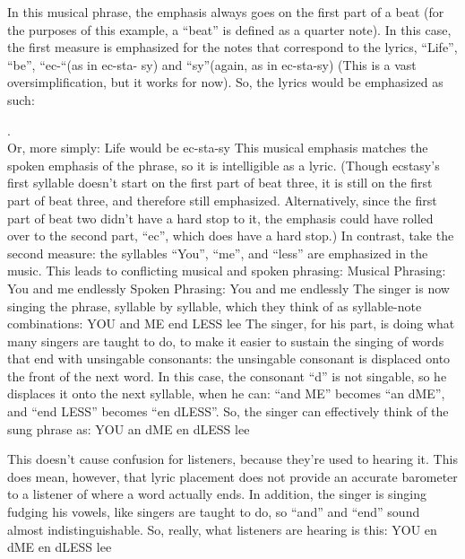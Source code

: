 \documentclass[10pt,oneside]{memoir}
\begin{document}
In this musical phrase, the emphasis always goes on the first part of a beat (for the purposes of this example, a ``beat'' is defined as a quarter note).
In this case, the first measure is emphasized for the notes that correspond to the lyrics, ``Life'', ``be'', ``ec-``(as in ec-sta- sy) and ``sy''(again, as in ec-sta-sy) (This is a vast oversimplification, but it works for now). So, the lyrics would be emphasized as such:
\begin{figure}
\begin{center}
\end{center}
\label{page2image44544.png}
\end{figure}

    . \\
Or, more simply:
Life would be ec-sta-sy
This musical emphasis matches the spoken emphasis of the phrase, so it is intelligible as a lyric. (Though ecstasy's first syllable doesn't start on the first part of beat three, it is still on the first part of beat three, and therefore still emphasized. Alternatively, since the first part of beat two didn't have a hard stop to it, the emphasis could have rolled over to the second part, ``ec'', which does have a hard stop.)
In contrast, take the second measure: the syllables ``You'', ``me'', and ``less'' are emphasized in the music. This leads to conflicting musical and spoken phrasing:
Musical Phrasing: You and me endlessly 
Spoken Phrasing: You and me endlessly
The singer is now singing the phrase, syllable by syllable, which they think of as syllable-note combinations:
YOU and ME end LESS lee
The singer, for his part, is doing what many singers are taught to do, to make it easier to sustain the singing of words that end with unsingable consonants: the unsingable consonant is displaced onto the front of the next word. In this case, the consonant ``d'' is not singable, so he displaces it onto the next syllable, when he can: ``and ME'' becomes ``an dME'', and ``end LESS'' becomes ``en dLESS''. So, the singer can effectively think of the sung phrase as:
YOU an dME en dLESS lee


This doesn't cause confusion for listeners, because they're used to hearing it. This does mean, however, that lyric placement does not provide an accurate barometer to a listener of where a word actually ends.
In addition, the singer is singing fudging his vowels, like singers are taught to do, so ``and'' and ``end'' sound almost indistinguishable. So, really, what listeners are hearing is this:
YOU en dME en dLESS lee
\end{document}

